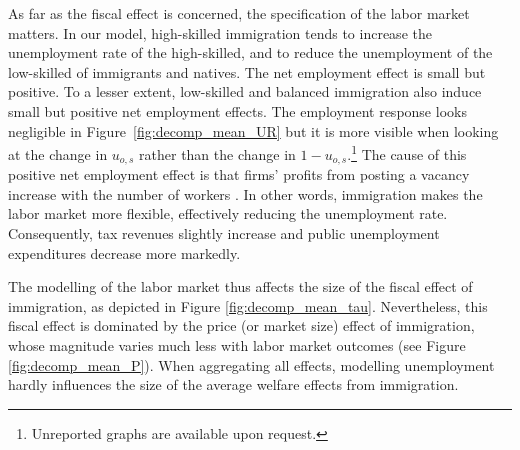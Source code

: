 \documentclass[a4paper,12pt]{article}
\begin{document}
As far as the fiscal effect is concerned, the specification of the labor market matters. In our model, high-skilled immigration tends to increase the unemployment rate of the high-skilled, and to reduce the unemployment of the low-skilled of immigrants and natives. The net employment effect is small but positive. To a lesser extent, low-skilled and balanced immigration also induce small but positive net employment effects. The employment response looks negligible in Figure~\ref{fig:decomp_mean_UR} but it is more visible when looking at the change in $u_{o,s}$ rather than the change in $1-u_{o,s}$.\footnote{Unreported graphs are available upon request.} The cause of this positive net employment effect is that firms' profits from posting a vacancy increase with the number of workers \citep[as in][]{Battisti2018}. In other words, immigration  makes the  labor market  more  flexible,  effectively  reducing  the  unemployment  rate. Consequently, tax revenues slightly increase and public unemployment expenditures decrease more markedly.

The modelling of the labor market thus affects the size of the fiscal effect of immigration, as depicted in Figure \ref{fig:decomp_mean_tau}. Nevertheless, this fiscal effect is dominated by the price (or market size) effect of immigration, whose magnitude varies much less with labor market outcomes (see Figure \ref{fig:decomp_mean_P}). When aggregating all effects, modelling unemployment hardly influences the size of the average welfare effects from immigration.
\end{document}

